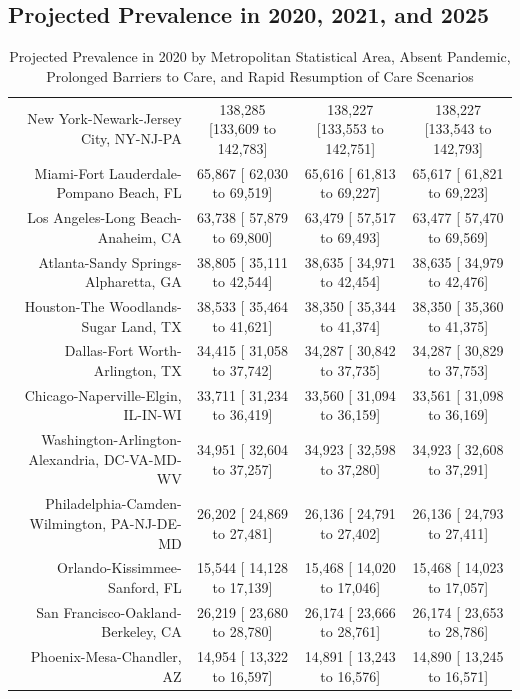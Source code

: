 \documentclass{article}
\begin{document}

\subsection{Projected Prevalence in 2020, 2021, and 2025}

\begin{table}[H]
	\caption{Projected Prevalence in 2020 by Metropolitan Statistical Area, Absent Pandemic, Prolonged Barriers to Care, and Rapid Resumption of Care Scenarios}
	\footnotesize
	\begin{tabular}{|r|c|c|c|}
		\hline\hline
		New York-Newark-Jersey City, NY-NJ-PA & 138,285 [133,609 to 142,783] & 138,227 [133,553 to 142,751] & 138,227 [133,543 to 142,793]\\
		Miami-Fort Lauderdale-Pompano Beach, FL &  65,867 [ 62,030 to  69,519] &  65,616 [ 61,813 to  69,227] &  65,617 [ 61,821 to  69,223]\\
		Los Angeles-Long Beach-Anaheim, CA &  63,738 [ 57,879 to  69,800] &  63,479 [ 57,517 to  69,493] &  63,477 [ 57,470 to  69,569]\\
		Atlanta-Sandy Springs-Alpharetta, GA &  38,805 [ 35,111 to  42,544] &  38,635 [ 34,971 to  42,454] &  38,635 [ 34,979 to  42,476]\\
		Houston-The Woodlands-Sugar Land, TX &  38,533 [ 35,464 to  41,621] &  38,350 [ 35,344 to  41,374] &  38,350 [ 35,360 to  41,375]\\
		Dallas-Fort Worth-Arlington, TX &  34,415 [ 31,058 to  37,742] &  34,287 [ 30,842 to  37,735] &  34,287 [ 30,829 to  37,753]\\
		Chicago-Naperville-Elgin, IL-IN-WI &  33,711 [ 31,234 to  36,419] &  33,560 [ 31,094 to  36,159] &  33,561 [ 31,098 to  36,169]\\
		Washington-Arlington-Alexandria, DC-VA-MD-WV &  34,951 [ 32,604 to  37,257] &  34,923 [ 32,598 to  37,280] &  34,923 [ 32,608 to  37,291]\\
		Philadelphia-Camden-Wilmington, PA-NJ-DE-MD &  26,202 [ 24,869 to  27,481] &  26,136 [ 24,791 to  27,402] &  26,136 [ 24,793 to  27,411]\\
		Orlando-Kissimmee-Sanford, FL &  15,544 [ 14,128 to  17,139] &  15,468 [ 14,020 to  17,046] &  15,468 [ 14,023 to  17,057]\\
		San Francisco-Oakland-Berkeley, CA &  26,219 [ 23,680 to  28,780] &  26,174 [ 23,666 to  28,761] &  26,174 [ 23,653 to  28,786]\\
		Phoenix-Mesa-Chandler, AZ &  14,954 [ 13,322 to  16,597] &  14,891 [ 13,243 to  16,576] &  14,890 [ 13,245 to  16,571]\\

\end{tabular}
\end{table}
\end{document}
